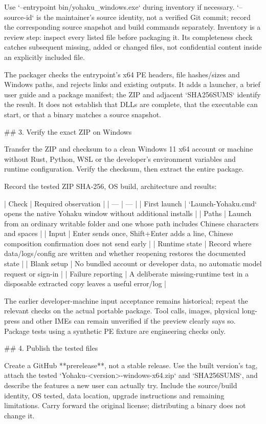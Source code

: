 Use `--entrypoint bin/yohaku_windows.exe` during inventory if necessary.
`--source-id` is the maintainer's source identity, not a verified Git commit;
record the corresponding source snapshot and build commands separately. Inventory
is a review step: inspect every listed file before packaging it. Its completeness
check catches subsequent missing, added or changed files, not confidential content
inside an explicitly included file.

The packager checks the entrypoint's x64 PE headers, file hashes/sizes and Windows
paths, and rejects links and existing outputs. It adds a launcher, a brief user
guide and a package manifest; the ZIP and adjacent `SHA256SUMS` identify the
result. It does not establish that DLLs are complete, that the executable can
start, or that a binary matches a source snapshot.

## 3. Verify the exact ZIP on Windows

Transfer the ZIP and checksum to a clean Windows 11 x64 account or machine
without Rust, Python, WSL or the developer's environment variables and runtime
configuration. Verify the checksum, then extract the entire package.

Record the tested ZIP SHA-256, OS build, architecture and results:

| Check | Required observation |
| --- | --- |
| First launch | `Launch-Yohaku.cmd` opens the native Yohaku window without additional installs |
| Paths | Launch from an ordinary writable folder and one whose path includes Chinese characters and spaces |
| Input | Enter sends once, Shift+Enter adds a line, Chinese composition confirmation does not send early |
| Runtime state | Record where data/logs/config are written and whether reopening restores the documented state |
| Blank setup | No bundled account or developer data, no automatic model request or sign-in |
| Failure reporting | A deliberate missing-runtime test in a disposable extracted copy leaves a useful error/log |

The earlier developer-machine input acceptance remains historical; repeat the
relevant checks on the actual portable package. Tool calls, images, physical
long-press and other IMEs can remain unverified if the preview clearly says so.
Package tests using a synthetic PE fixture are engineering checks only.

## 4. Publish the tested files

Create a GitHub **prerelease**, not a stable release. Use the built version's
tag, attach the tested `Yohaku-<version>-windows-x64.zip` and `SHA256SUMS`,
and describe the features a new user can actually try. Include the source/build
identity, OS tested, data location, upgrade instructions and remaining limitations.
Carry forward the original license; distributing a binary does not change it.

